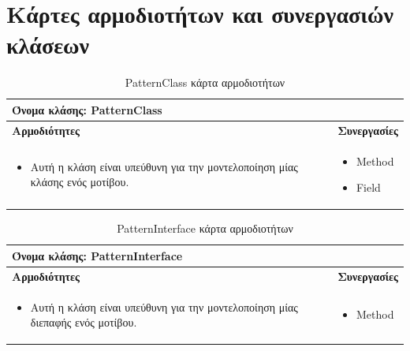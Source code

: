 \section{Κάρτες αρμοδιοτήτων και συνεργασιών κλάσεων}
\label{sec:crc}
\begin{table}[H]
    \centering
    \begin{tabular}{|p{5cm}|p{5cm}|}
        \hline
        \multicolumn{2}{|l|}{Όνομα κλάσης: PatternClass} \\
        \hline
        \textbf{Αρμοδιότητες} & \textbf{Συνεργασίες} \\
        \hline
        \begin{itemize}
            \item Αυτή η κλάση είναι υπεύθυνη για την μοντελοποίηση μίας κλάσης ενός μοτίβου.
        \end{itemize} &   
        \begin{itemize}
            \item Method
            \item Field
        \end{itemize} \\
        \hline
    \end{tabular}
    \label{tab:PatternClassCRC}
    \caption{PatternClass κάρτα αρμοδιοτήτων}
\end{table}
\begin{table}[H]
    \centering
    \begin{tabular}{|p{5cm}|p{5cm}|}
        \hline
        \multicolumn{2}{|l|}{Όνομα κλάσης: PatternInterface} \\
        \hline
        \textbf{Αρμοδιότητες} & \textbf{Συνεργασίες} \\
        \hline
        \begin{itemize}
            \item Αυτή η κλάση είναι υπεύθυνη για την μοντελοποίηση μίας διεπαφής ενός μοτίβου.
        \end{itemize} &   
        \begin{itemize}
            \item Method
        \end{itemize} \\
        \hline
    \end{tabular}
    \label{tab:PatternInterfaceCRC}
    \caption{PatternInterface κάρτα αρμοδιοτήτων}
\end{table}
